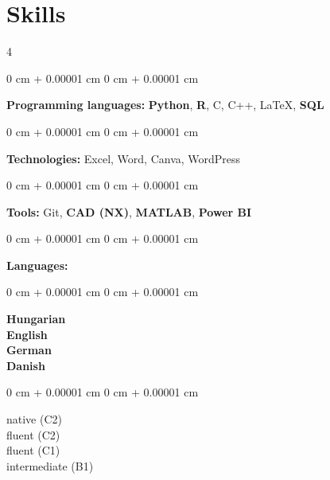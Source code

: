 \documentclass[10pt, letterpaper]{article}
\newenvironment{onecolentry}{
    \begin{adjustwidth}{
        0 cm + 0.00001 cm
    }{
        0 cm + 0.00001 cm
    }
}{
    \end{adjustwidth}
} %
\begin{document}
    \section{Skills}
        \setcolumnwidth{\fill, 2 cm, 2 cm, 3 cm}
        \begin{paracol}{4}
 
        \begin{onecolentry}
            \textbf{Programming languages:} \textbf{Python}, \textbf{R}, C, C++, LaTeX, \textbf{SQL}\end{onecolentry}

        \vspace{0.2 cm}

        \begin{onecolentry}
            \textbf{Technologies:} Excel, Word, Canva, WordPress\end{onecolentry}

        \vspace{0.2 cm}

        \begin{onecolentry}
            \textbf{Tools:} Git, \textbf{CAD (NX)}, \textbf{MATLAB}, \textbf{Power BI}\end{onecolentry}

        \switchcolumn

        \begin{onecolentry}
            \textbf{Languages:}\end{onecolentry}

        \switchcolumn

        \begin{onecolentry}
            \raggedright
            \textbf{Hungarian} \\\textbf{English} \\\textbf{German} \\\textbf{Danish}
        \end{onecolentry}

        \switchcolumn
        
        \begin{onecolentry}
            \raggedleft
            native (C2) \\fluent (C2) \\fluent (C1) \\intermediate (B1)\end{onecolentry}

        \end{paracol}
\end{document}
